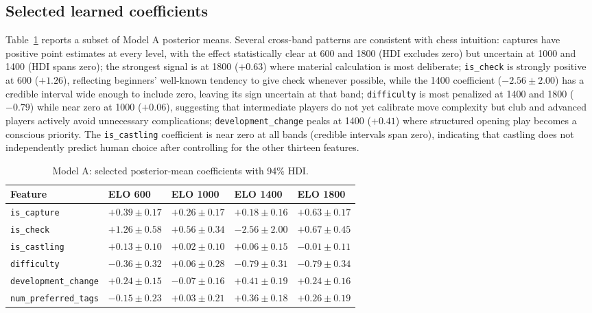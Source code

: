 \documentclass[11pt]{article}
\begin{document}
\subsection{Selected learned coefficients}
Table~\ref{tab:modelA-selected} reports a subset of Model A posterior means. Several cross-band patterns are consistent with chess intuition: captures have positive point estimates at every level, with the effect statistically clear at 600 and 1800 (HDI excludes zero) but uncertain at 1000 and 1400 (HDI spans zero); the strongest signal is at 1800 ($+0.63$) where material calculation is most deliberate; \texttt{is\_check} is strongly positive at 600 ($+1.26$), reflecting beginners' well-known tendency to give check whenever possible, while the 1400 coefficient ($-2.56 \pm 2.00$) has a credible interval wide enough to include zero, leaving its sign uncertain at that band; \texttt{difficulty} is most penalized at 1400 and 1800 ($-0.79$) while near zero at 1000 ($+0.06$), suggesting that intermediate players do not yet calibrate move complexity but club and advanced players actively avoid unnecessary complications; \texttt{development\_change} peaks at 1400 ($+0.41$) where structured opening play becomes a conscious priority. The \texttt{is\_castling} coefficient is near zero at all bands (credible intervals span zero), indicating that castling does not independently predict human choice after controlling for the other thirteen features.

\begin{table}[h]
\centering
\caption{Model A: selected posterior-mean coefficients with 94\% HDI.}
\label{tab:modelA-selected}
\small
\begin{tabular}{@{}lllll@{}}
\toprule
Feature & ELO 600 & ELO 1000 & ELO 1400 & ELO 1800 \\
\midrule
\texttt{is\_capture}          & $+0.39 \pm 0.17$ & $+0.26 \pm 0.17$ & $+0.18 \pm 0.16$ & $+0.63 \pm 0.17$ \\
\texttt{is\_check}            & $+1.26 \pm 0.58$ & $+0.56 \pm 0.34$ & $-2.56 \pm 2.00$ & $+0.67 \pm 0.45$ \\
\texttt{is\_castling}         & $+0.13 \pm 0.10$ & $+0.02 \pm 0.10$ & $+0.06 \pm 0.15$ & $-0.01 \pm 0.11$ \\
\texttt{difficulty}           & $-0.36 \pm 0.32$ & $+0.06 \pm 0.28$ & $-0.79 \pm 0.31$ & $-0.79 \pm 0.34$ \\
\texttt{development\_change}  & $+0.24 \pm 0.15$ & $-0.07 \pm 0.16$ & $+0.41 \pm 0.19$ & $+0.24 \pm 0.16$ \\
\texttt{num\_preferred\_tags} & $-0.15 \pm 0.23$ & $+0.03 \pm 0.21$ & $+0.36 \pm 0.18$ & $+0.26 \pm 0.19$ \\
\bottomrule
\end{tabular}
\end{table}
\end{document}
